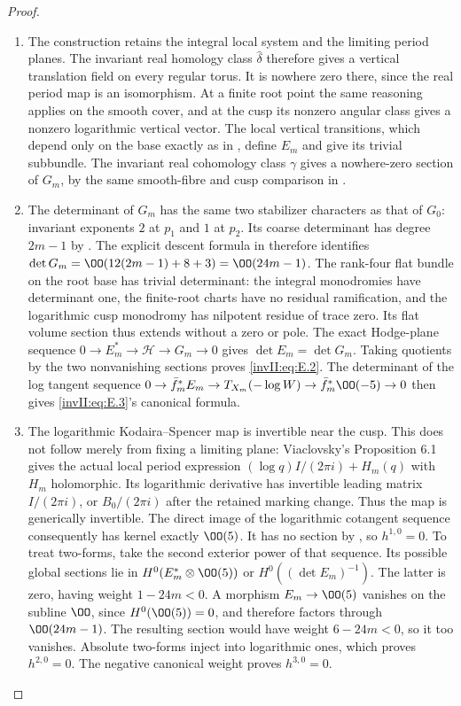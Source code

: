 \begin{proof}

\begin{enumerate}[label={$\langle1\rangle$\arabic*.},leftmargin=*]
\item The construction retains the integral local system and the limiting
period planes. The invariant real homology class $\widehat\delta$
therefore gives a vertical translation field on every regular torus.
It is nowhere zero there, since the real period map is an isomorphism.
At a finite root point the same reasoning applies on the smooth
cover, and at the cusp its nonzero angular class gives a nonzero
logarithmic vertical vector. The local vertical transitions, which
depend only on the base exactly as in , define $E_m$ and give its
trivial subbundle. The invariant real cohomology class $\gamma$ gives
a nowhere-zero section of $G_m$, by the same smooth-fibre and cusp
comparison in .

\item The determinant of $G_m$ has the same two stabilizer characters as
that of $G_0$: invariant exponents $2$ at $p_1$ and $1$ at $p_2$.
Its coarse determinant has degree $2m-1$ by . The explicit descent
formula in  therefore identifies
$\det G_m=\OO(12(2m-1)+8+3)=\OO(24m-1)$.
The rank-four flat bundle on the root base has trivial determinant:
the integral monodromies have determinant one, the finite-root charts
have no residual ramification, and the logarithmic cusp monodromy
has nilpotent residue of trace zero. Its flat volume section thus
extends without a zero or pole. The exact Hodge-plane sequence
$0\to E_m^*\to\mathcal H\to G_m\to0$ gives
$\det E_m=\det G_m$. Taking quotients by the two nonvanishing
sections proves \eqref{invII:eq:E.2}. The determinant of the log tangent sequence
$0\to\bar f_m^*E_m\to T_{X_m}(-\log W)
\to\bar f_m^*\OO(-5)\to0$ then gives \eqref{invII:eq:E.3}'s canonical formula.

\item The logarithmic Kodaira--Spencer map is invertible near the cusp.
This does not follow merely from fixing a limiting plane:
Viaclovsky's Proposition 6.1 gives the actual local period expression
$(\log q)I/(2\pi i)+H_m(q)$ with $H_m$ holomorphic. Its logarithmic
derivative has invertible leading matrix $I/(2\pi i)$, or
$B_0/(2\pi i)$ after the retained marking change. Thus the map is
generically invertible. The direct image of the logarithmic
cotangent sequence consequently has kernel exactly $\OO(5)$.
It has no section by , so $h^{1,0}=0$. To treat two-forms, take
the second exterior power of that sequence. Its possible global
sections lie in
$H^0(E_m^*\otimes\OO(5))$ or
$H^0((\det E_m)^{-1})$.
The latter is zero, having weight $1-24m<0$. A morphism
$E_m\to\OO(5)$ vanishes on the subline $\OO$, since
$H^0(\OO(5))=0$, and therefore factors through $\OO(24m-1)$.
The resulting section would have weight $6-24m<0$, so it too
vanishes. Absolute two-forms inject into logarithmic ones, which
proves $h^{2,0}=0$. The negative canonical weight proves $h^{3,0}=0$.


\end{enumerate}
\end{proof}
